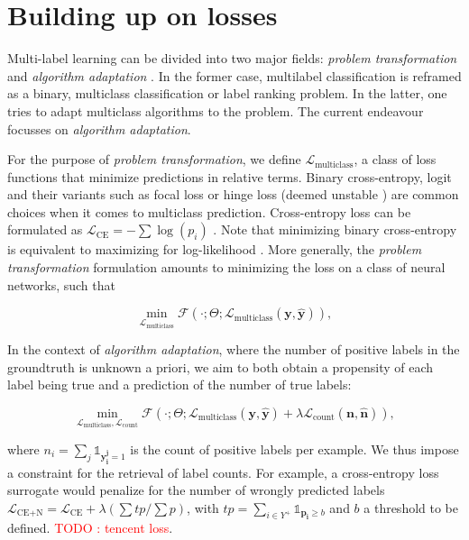 \documentclass[sigconf,natbib,screen=true,review=true,anonymous]{acmart}
\newcommand\todo[1]{\textcolor{red}{TODO : #1}}
\begin{document}
\section{Building up on losses}
\label{sec:org2b0f4c8}

Multi-label learning can be divided into two major fields: \emph{problem transformation} and \emph{algorithm adaptation} \cite{multilabelReview}. In the former case, multilabel classification is reframed as a binary, multiclass classification or label ranking problem. In the latter, one tries to adapt multiclass algorithms to the problem. The current endeavour focusses on \emph{algorithm adaptation}.


For the purpose of \emph{problem transformation}, we define \(\mathcal{L}_{\text {multiclass}}\), a class of loss functions that minimize predictions in relative terms. Binary cross-entropy, logit and their variants such as focal loss or hinge loss (deemed unstable \cite{focalLoss}) are common choices when it comes to multiclass prediction. Cross-entropy loss can be formulated as \(\mathcal{L}_{\text {CE}}=-\sum \log \left(p_{i}\right)\) . Note that minimizing binary cross-entropy is equivalent to maximizing for log-likelihood \cite[Section 4.3.4]{Bishop}. More generally, the \emph{problem transformation} formulation amounts to minimizing the loss on a class of neural networks, such that

\begin{equation}
\underset{\mathcal{L}_{\text {multiclass}}} {\min} \mathcal{F}\left(\cdot ; \Theta; \mathcal{L}_{\text {multiclass}} (\mathbf{y}, \hat{\mathbf{y}}) \right),
\end{equation}

In the context of \emph{algorithm adaptation}, where the number of positive labels in the groundtruth is unknown a priori, we aim to both obtain a propensity of each label being true and a prediction of the number of true labels: 

\begin{equation}
\underset{\mathcal{L}_{\text {multiclass}}, \mathcal{L}_{\text {count}}} {\min} \mathcal{F}\left(\cdot ; \Theta; \mathcal{L}_{\text {multiclass}} (\mathbf{y}, \hat{\mathbf{y}}) + \lambda \mathcal{L}_{\text {count}} (\mathbf{n}, \hat{\mathbf{n}})\right),
\end{equation}

where \(n_i = \sum_j \mathds{1}_{\mathbf{y_i^j} = 1}\) is the count of positive labels per example. We thus impose a constraint for the retrieval of label counts. For example, a cross-entropy loss surrogate would penalize for the number of wrongly predicted labels \(\mathcal{L}_{\text {CE+N}}= \mathcal{L}_{\text {CE}} + \lambda (\sum tp / \sum p)\), with \(t p=\sum_{i \in Y^{+}} \mathds{1}_{\mathbf{p_i} \geq b}\) and \(b\) a threshold to be defined. \todo{tencent loss}.
\end{document}
